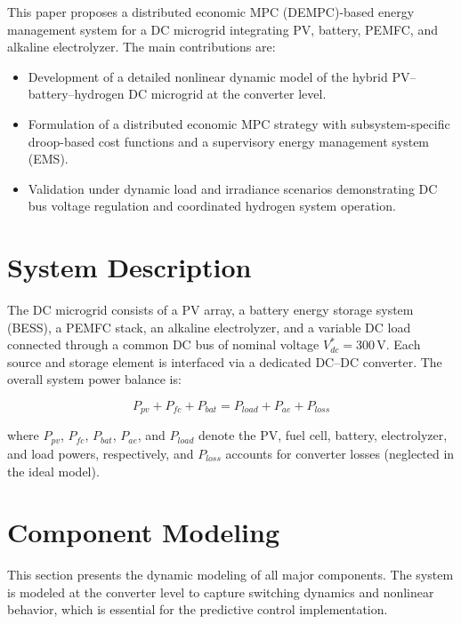 \documentclass[journal]{IEEEtran}
\begin{document}
This paper proposes a distributed economic MPC (DEMPC)-based energy
management system for a DC microgrid integrating PV, battery, PEMFC, and
alkaline electrolyzer. The main contributions are:
\begin{itemize}
\item Development of a detailed nonlinear dynamic model of the hybrid
      PV--battery--hydrogen DC microgrid at the converter level.
\item Formulation of a distributed economic MPC strategy with subsystem-specific
      droop-based cost functions and a supervisory energy management system (EMS).
\item Validation under dynamic load and irradiance scenarios demonstrating
      DC bus voltage regulation and coordinated hydrogen system operation.
\end{itemize}

\section{System Description}

The DC microgrid consists of a PV array, a battery energy storage system
(BESS), a PEMFC stack, an alkaline electrolyzer, and a variable DC load
connected through a common DC bus of nominal voltage $V_{dc}^{*} = 300$\,V.
Each source and storage element is interfaced via a dedicated DC--DC
converter. The overall system power balance is:

\begin{equation}
P_{pv} + P_{fc} + P_{bat} = P_{load} + P_{ae} + P_{loss}
\label{eq:power_balance}
\end{equation}

where $P_{pv}$, $P_{fc}$, $P_{bat}$, $P_{ae}$, and $P_{load}$ denote the
PV, fuel cell, battery, electrolyzer, and load powers, respectively, and
$P_{loss}$ accounts for converter losses (neglected in the ideal model).

\section{Component Modeling}
\label{sec:modeling}

This section presents the dynamic modeling of all major components. The
system is modeled at the converter level to capture switching dynamics and
nonlinear behavior, which is essential for the predictive control
implementation.
\end{document}
